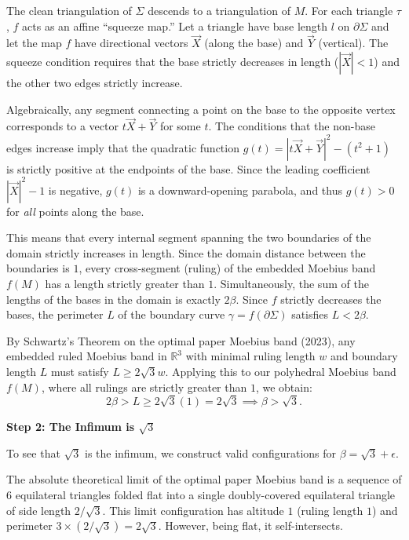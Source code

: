 \documentclass[12pt]{article}
\begin{document}
The clean triangulation of $\Sigma$ descends to a triangulation of $M$. For each triangle $\tau$, $f$ acts as an affine ``squeeze map.'' Let a triangle have base length $l$ on $\partial \Sigma$ and let the map $f$ have directional vectors $\vec{X}$ (along the base) and $\vec{Y}$ (vertical). The squeeze condition requires that the base strictly decreases in length ($|\vec{X}| < 1$) and the other two edges strictly increase. 

Algebraically, any segment connecting a point on the base to the opposite vertex corresponds to a vector $t \vec{X} + \vec{Y}$ for some $t$. The conditions that the non-base edges increase imply that the quadratic function $g(t) = |t \vec{X} + \vec{Y}|^2 - (t^2 + 1)$ is strictly positive at the endpoints of the base. Since the leading coefficient $|\vec{X}|^2 - 1$ is negative, $g(t)$ is a downward-opening parabola, and thus $g(t) > 0$ for \emph{all} points along the base. 

This means that every internal segment spanning the two boundaries of the domain strictly increases in length. Since the domain distance between the boundaries is $1$, every cross-segment (ruling) of the embedded Moebius band $f(M)$ has a length strictly greater than $1$. 
Simultaneously, the sum of the lengths of the bases in the domain is exactly $2\beta$. Since $f$ strictly decreases the bases, the perimeter $L$ of the boundary curve $\gamma = f(\partial \Sigma)$ satisfies $L < 2\beta$.

By Schwartz's Theorem on the optimal paper Moebius band (2023), any embedded ruled Moebius band in $\mathbb{R}^3$ with minimal ruling length $w$ and boundary length $L$ must satisfy $L \ge 2\sqrt{3} w$. 
Applying this to our polyhedral Moebius band $f(M)$, where all rulings are strictly greater than $1$, we obtain:
\[
2\beta > L \ge 2\sqrt{3}(1) = 2\sqrt{3} \implies \beta > \sqrt{3}.
\]

\vspace{1em}

\noindent\textbf{Step 2: The Infimum is $\sqrt{3}$}

\vspace{0.5em}

To see that $\sqrt{3}$ is the infimum, we construct valid configurations for $\beta = \sqrt{3} + \epsilon$.

The absolute theoretical limit of the optimal paper Moebius band is a sequence of $6$ equilateral triangles folded flat into a single doubly-covered equilateral triangle of side length $2/\sqrt{3}$. This limit configuration has altitude $1$ (ruling length $1$) and perimeter $3 \times (2/\sqrt{3}) = 2\sqrt{3}$. However, being flat, it self-intersects.
\end{document}
